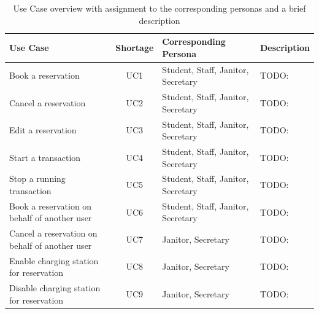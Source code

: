 \begingroup
\setlength{\tabcolsep}{10pt} %
\renewcommand{\arraystretch}{1.5} %
\begin{table}[!ht]
    \centering
    \begin{tabular}{m{3.5cm}|c|m{3cm}|m{4cm}}
        Use Case & Shortage & Corresponding Persona & Description \\
        \hline
        Book a reservation & UC1 & Student, Staff, Janitor, Secretary & TODO: \\
        Cancel a reservation & UC2 & Student, Staff, Janitor, Secretary & TODO: \\
        Edit a reservation & UC3 & Student, Staff, Janitor, Secretary & TODO: \\
        Start a transaction & UC4 & Student, Staff, Janitor, Secretary & TODO: \\
        Stop a running transaction & UC5 & Student, Staff, Janitor, Secretary & TODO: \\
        Book a reservation on behalf of another user  & UC6 & Student, Staff, Janitor, Secretary & TODO: \\ 
        Cancel a reservation on behalf of another user & UC7 & Janitor, Secretary & TODO: \\
        Enable charging station for reservation & UC8 & Janitor, Secretary & TODO: \\
        Disable charging station for reservation & UC9 & Janitor, Secretary & TODO: \\
    \end{tabular}
    \caption{Use Case overview with assignment to the corresponding personas and a brief description}
    \label{tab:use_case_overview}
\end{table}
\endgroup
